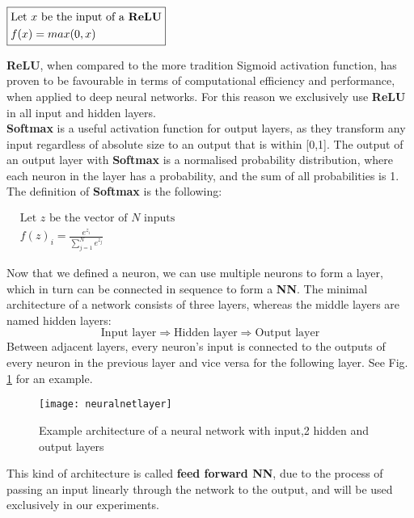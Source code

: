 \begin{center}
    \begin{math}
        \boxed{
            \begin{aligned}
                &\textrm{Let } x \textrm{ be the input of a \textbf{ReLU}}\\
                &f(x) = max(0,x)
            \end{aligned}
        }
        \label{activationRelu}
    \end{math}
\end{center}
\textbf{ReLU}, when compared to the more tradition Sigmoid activation function, has proven to be favourable in terms
of computational efficiency and performance, when applied to deep neural networks. \cite{krizhevsky2012imagenet}
For this reason we exclusively use \textbf{ReLU} in all input and hidden layers.
\\
\textbf{Softmax} is a useful activation function for output layers, as they transform any input regardless of
absolute size to an output that is within [0,1].
The output of an output layer with \textbf{Softmax} is a normalised probability distribution, where each neuron in
the layer has a probability, and the sum of all probabilities is 1.
The definition of \textbf{Softmax} is the following:
\begin{center}
    \begin{math}
        \boxed{
            \begin{aligned}
                &\textrm{Let } z \textrm{ be the vector of } N \textrm{ inputs} \\
                &f(z)_{i} = \frac{e^{z_{i}}}{\sum_{j=1}^{N} e^{z_{j}} }
            \end{aligned}
        }
        \label{activationSoftmax}
    \end{math}
\end{center}
Now that we defined a neuron, we can use multiple neurons to form a layer, which in turn can be connected in sequence
to form a \textbf{NN}.
The minimal architecture of a network consists of three layers, whereas the middle layers are named hidden layers:
\[\text{Input layer}\Rightarrow\text{Hidden layer}\Rightarrow\text{Output layer}\]
\newline
Between adjacent layers, every neuron's input is connected to the outputs of every neuron in the previous layer and
vice versa for the following layer.
See Fig. \ref{fig:architecture} for an example.
\newline

\begin{figure}[h!]
    \centering
    \texttt{[image: neuralnetlayer]}
    \caption{Example architecture of a neural network with input,2 hidden and output layers}
    \label{fig:architecture}
\end{figure}
This kind of architecture is called \textbf{feed forward NN}, due to the process of passing an input linearly through
the network to the output, and will be used exclusively in our experiments.\\

